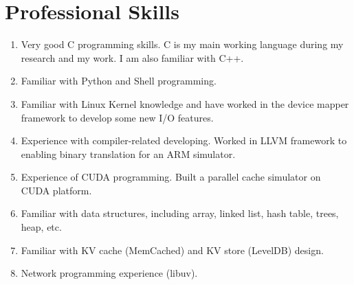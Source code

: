 \documentclass{article}
\begin{document}
\section{Professional Skills}
\begin{enumerate}
\item	Very good C programming skills. C is my main working language during my research and my work. I am also familiar with C++.
\item	Familiar with Python and Shell programming.
\item	Familiar with Linux Kernel knowledge and have worked in the device mapper framework to develop some new I/O features.
\item	Experience with compiler-related developing. Worked in LLVM framework to enabling binary translation for an ARM simulator. 
\item	Experience of CUDA programming. Built a parallel cache simulator on CUDA platform.
\item	Familiar with data structures, including array, linked list, hash table, trees, heap, etc.
\item   Familiar with KV cache (MemCached) and KV store (LevelDB) design.
\item	Network programming experience (libuv).
\end{enumerate}

\end{document}
